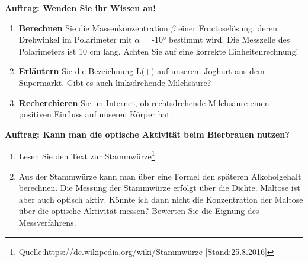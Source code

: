 \documentclass{scrartcl}  %
\begin{document}
			\noindent \textbf{Auftrag: Wenden Sie ihr Wissen an!}
			\begin{enumerate}
			\item \textbf{Berechnen} Sie die Massenkonzentration $\beta$ einer Fructoselösung, deren Drehwinkel im Polarimeter mit $\alpha$ = -10° bestimmt wird. Die Messzelle des Polarimeters ist 10 cm lang. Achten Sie auf eine korrekte Einheitenrechnung!
    		\item \textbf{Erläutern} Sie die Bezeichnung L(+) auf unserem Joghurt aus dem Supermarkt. Gibt es auch linksdrehende Milchsäure? 
    		\item \textbf{Recherchieren} Sie im Internet, ob rechtsdrehende Milchsäure einen positiven Einfluss auf unseren Körper hat.	
    		\end{enumerate}
    		
    		\noindent \textbf{Auftrag: Kann man die optische Aktivität beim Bierbrauen nutzen?}
    		\begin{enumerate}
    		\item Lesen Sie den Text zur Stammwürze\footnote{Quelle:https://de.wikipedia.org/wiki/Stammwürze [Stand:25.8.2016]}.
    		 \item Aus der Stammwürze kann man über eine Formel den späteren Alkoholgehalt berechnen. Die Messung der Stammwürze erfolgt über die Dichte. Maltose ist aber auch optisch aktiv. Könnte ich dann nicht die Konzentration der Maltose über die optische Aktivität messen? Bewerten Sie die Eignung des Messverfahrens.
    		\end{enumerate}
\end{document}
